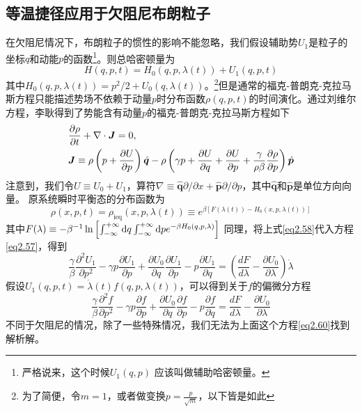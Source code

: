 \subsection{等温捷径应用于欠阻尼布朗粒子}
\qquad 在欠阻尼情况下，布朗粒子的惯性的影响不能忽略，我们假设辅助势$U_1$是粒子的坐标$q$和动能$p$的函数\footnote{严格说来，这个时候$U_1 (q,p)$ 应该叫做辅助哈密顿量。}。则总哈密顿量为
\begin{equation}
    H(q, p, t)=H_{0}(q, p, \lambda(t))+U_{1}(q, p, t)
    \label{eq2.56}
\end{equation}
其中$H_{0}(q, p, \lambda(t))=p^{2}/{2}+U_{0}(q, \lambda(t))$。\footnote{为了简便，令$m=1$，或者做变换$p=\frac{p}{\sqrt{m}}，以下皆是如此$}但是通常的福克-普朗克-克拉马斯方程只能描述势场不依赖于动量$p$时分布函数$\rho (q,p,t)$的时间演化。通过刘维尔方程，李耿\cite{Li2016}得到了势能含有动量$p$的福克-普朗克-克拉马斯方程如下
\begin{equation}
    \begin{split}
        &\frac{\partial \rho}{\partial t} + \nabla \cdot \bm{J} = 0, \\
        &\bm{J} \equiv \rho \left( p + \frac{\partial U}{\partial p} \right) \hat{\bm{q}}-\rho\left(\gamma p+\frac{\partial U}{\partial q}+ \frac{\partial U}{\partial p} + \frac{\gamma}{\rho \beta} \frac{\partial \rho}{\partial p}\right) \hat{\bm{p}}
    \end{split} 
    \label{eq2.57}
\end{equation}
注意到，我们令$U \equiv U_0 + U_1$，算符$\nabla \equiv \hat{\bm{q}} \partial / \partial x+\hat{\bm{p}} \partial / \partial p$，其中$\hat{\bm{q}}$和$\hat{\bm{p}}$是单位方向向量。
原系统瞬时平衡态的分布函数为
\begin{equation}
    \rho(x, p, t)=\rho_{\mathrm{ieq}}(x, p, \lambda(t)) \equiv e^{\beta\left[F(\lambda(t))-H_{0}(x, p, \lambda(t))\right]}
    \label{eq2.58}
\end{equation}
其中$F(\lambda) \equiv-\beta^{-1} \ln \left[\int_{-\infty}^{+\infty} \mathrm{d} q \int_{-\infty}^{+\infty} \mathrm{d} p e^{-\beta H_{0}(q, p, \lambda)}\right]$
同理，将上式\eqref{eq2.58}代入方程\eqref{eq2.57}，得到
\begin{equation}
    \frac{\gamma}{\beta} \frac{\partial^{2} U_{1}}{\partial p^{2}}-\gamma p \frac{\partial U_{1}}{\partial p}+\frac{\partial U_{0}}{\partial q} \frac{\partial U_{1}}{\partial p}-p \frac{\partial U_{1}}{\partial q}=\left(\frac{d F}{d \lambda}-\frac{\partial U_{0}}{\partial \lambda}\right) \dot{\lambda}
    \label{eq2.59}
\end{equation}
假设$U_{1}(q, p, t)=\dot{\lambda}(t) f(q, p, \lambda(t))$，可以得到关于$f$的偏微分方程
\begin{equation}
    \frac{\gamma}{\beta} \frac{\partial^{2} f}{\partial p^{2}}-\gamma p \frac{\partial f}{\partial p}+\frac{\partial U_{0}}{\partial q} \frac{\partial f}{\partial p}-p \frac{\partial f}{\partial q}=\frac{d F}{d \lambda}-\frac{\partial U_{0}}{\partial \lambda}
    \label{eq2.60}
\end{equation}
不同于欠阻尼的情况，除了一些特殊情况，我们无法为上面这个方程\eqref{eq2.60}找到解析解。

